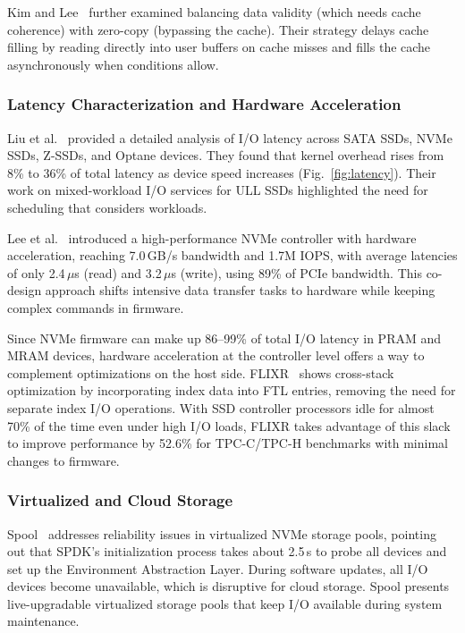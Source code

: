 \documentclass[conference]{IEEEtran}
\begin{document}
Kim and Lee~\cite{kim2021zero} further examined balancing data validity (which needs cache coherence) with zero-copy (bypassing the cache). Their strategy delays cache filling by reading directly into user buffers on cache misses and fills the cache asynchronously when conditions allow.

\subsubsection{Latency Characterization and Hardware Acceleration}
\label{sec:latchar}

Liu et al.~\cite{liu2022towards} provided a detailed analysis of I/O latency across SATA SSDs, NVMe SSDs, Z-SSDs, and Optane devices. They found that kernel overhead rises from 8\% to 36\% of total latency as device speed increases (Fig.~\ref{fig:latency}). Their work on mixed-workload I/O services for ULL SSDs highlighted the need for scheduling that considers workloads.

Lee et al.~\cite{lee2022nvmectrl} introduced a high-performance NVMe controller with hardware acceleration, reaching 7.0\,GB/s bandwidth and 1.7M IOPS, with average latencies of only 2.4\,$\mu$s (read) and 3.2\,$\mu$s (write), using 89\% of PCIe bandwidth. This co-design approach shifts intensive data transfer tasks to hardware while keeping complex commands in firmware.

Since NVMe firmware can make up 86--99\% of total I/O latency in PRAM and MRAM devices, hardware acceleration at the controller level offers a way to complement optimizations on the host side. FLIXR~\cite{he2022flixr} shows cross-stack optimization by incorporating index data into FTL entries, removing the need for separate index I/O operations. With SSD controller processors idle for almost 70\% of the time even under high I/O loads, FLIXR takes advantage of this slack to improve performance by 52.6\% for TPC-C/TPC-H benchmarks with minimal changes to firmware.

\subsubsection{Virtualized and Cloud Storage}
\label{sec:virt}

Spool~\cite{min2021spool} addresses reliability issues in virtualized NVMe storage pools, pointing out that SPDK's initialization process takes about 2.5\,s to probe all devices and set up the Environment Abstraction Layer. During software updates, all I/O devices become unavailable, which is disruptive for cloud storage. Spool presents live-upgradable virtualized storage pools that keep I/O available during system maintenance.
\end{document}
